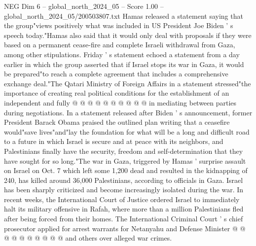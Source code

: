\begin{textsample}{NEG Dim 6 – global\_north\_2024\_05 – Score 1.00 – global\_north\_2024\_05/200503807.txt}
Hamas released a statement saying that the group"views positively what was included in US President Joe Biden ' s speech today."Hamas also said that it would only deal with proposals if they were based on a permanent cease-fire and complete Israeli withdrawal from Gaza, among other stipulations.
Friday ' s statement echoed a statement from a day earlier in which the group asserted that if Israel stops its war in Gaza, it would be prepared"to reach a complete agreement that includes a comprehensive exchange deal."The Qatari Ministry of Foreign Affairs in a statement stressed"the importance of creating real political conditions for the establishment of an independent and fully @ @ @ @ @ @ @ @ @ @ in mediating between parties during negotiations.
In a statement released after Biden ' s announcement, former President Barack Obama praised the outlined plan writing that a ceasefire would"save lives"and"lay the foundation for what will be a long and difficult road to a future in which Israel is secure and at peace with its neighbors, and Palestinians finally have the security, freedom and self-determination that they have sought for so long."The war in Gaza, triggered by Hamas ' surprise assault on Israel on Oct. 7 which left some 1,200 dead and resulted in the kidnapping of 240, has killed around 36,000 Palestinians, according to officials in Gaza.
Israel has been sharply criticized and become increasingly isolated during the war.
In recent weeks, the International Court of Justice ordered Israel to immediately halt its military offensive in Rafah, where more than a million Palestinians fled after being forced from their homes.
The International Criminal Court ' s chief prosecutor applied for arrest warrants for Netanyahu and Defense Minister @ @ @ @ @ @ @ @ @ @ and others over alleged war crimes.

\end{textsample}
